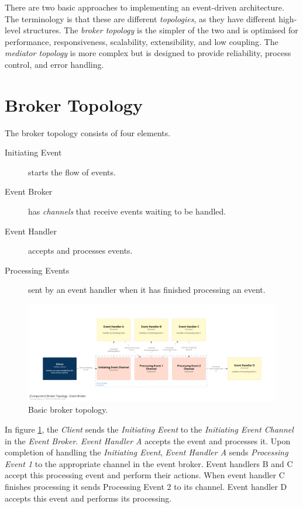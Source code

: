 There are two basic approaches to implementing an event-driven architecture.
The terminology is that these are different \emph{topologies}, as they have different high-level structures.
The \emph{broker topology} is the simpler of the two and is optimised for performance, responsiveness, scalability, extensibility, and low coupling.
The \emph{mediator topology} is more complex but is designed to provide reliability, process control, and error handling.


\section{Broker Topology}

The broker topology consists of four elements.

\begin{description}
    \item[Initiating Event] starts the flow of events.
    \item[Event Broker] has \emph{channels} that receive events waiting to be handled.
    \item[Event Handler] accepts and processes events.
    \item[Processing Events] sent by an event handler when it has finished processing an event.
\end{description}

\begin{figure}[h!]
    \begin{adjustwidth}{-10mm}{-10mm}
        \centering
        \includegraphics[trim=195 195 195 195,clip,width=0.97\paperwidth]{diagrams/broker-components.png}
    \end{adjustwidth}
    \caption{Basic broker topology.}
    \label{fig:broker-components}
\end{figure}

In figure \ref{fig:broker-components}, the \emph{Client} sends the \emph{Initiating Event} to the \emph{Initiating Event Channel} in the \emph{Event Broker}.
\emph{Event Handler A} accepts the event and processes it.
Upon completion of handling the \emph{Initiating Event},
\emph{Event Handler A} sends \emph{Processing Event 1} to the appropriate channel in the event broker.
Event handlers B and C accept this processing event and perform their actions.
When event handler C finishes processing it sends Processing Event 2 to its channel.
Event handler D accepts this event and performs its processing.


